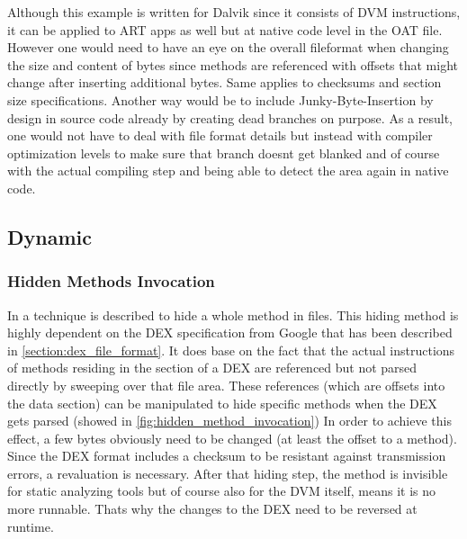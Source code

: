 Although this example is written for Dalvik since it consists of DVM
instructions, it can be applied to ART apps as well but at native code level
in the OAT file.
However one would need to have an eye on the overall fileformat when changing
the size and content of bytes since methods are referenced with offsets that
might change after inserting additional bytes. Same applies to checksums and
section size specifications. Another way would be to include Junky-Byte-Insertion by design in source code already by creating dead branches on
purpose. As a result, one would not have to deal with file format details
but instead with compiler optimization levels to make sure that branch doesnt
get blanked and of course with the actual compiling step and being able
to detect the area again in native code.


\subsection{Dynamic}
\subsubsection{Hidden Methods Invocation}
In \parencite{lvl_imp} a technique is described to hide a whole method
in  files. This hiding method is highly dependent on the DEX specification from Google \parencite{dex} that has been described in
\autoref{section:dex_file_format}.
It does base on the fact that the actual instructions of methods residing
in the  section of a DEX are referenced but not parsed directly
by sweeping over that file area.
These references (which are offsets into the data section) can be manipulated
to hide specific methods when the DEX gets parsed
(showed in \autoref{fig:hidden_method_invocation}) In order to achieve
this effect, a few bytes obviously need to be changed (at least the offset
to a method).
Since the DEX format includes a checksum to be resistant
against transmission errors, a revaluation is necessary.
After that hiding step, the method is invisible for static analyzing tools
but of course also for the DVM itself, means it is no more runnable.
Thats why the changes to the DEX need to be reversed at runtime.

